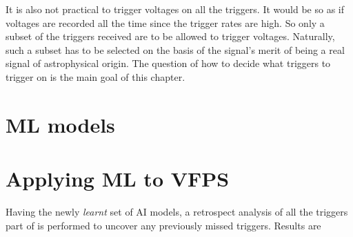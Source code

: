 \par It is also not practical to trigger voltages on all the triggers. It would be so as if voltages are recorded all the time since the trigger rates are high.
So only a subset of the triggers received are to be allowed to trigger voltages. 
Naturally, such a subset has to be selected on the basis of the signal's merit of being a real signal of astrophysical origin.
The question of how to decide what triggers to trigger on is the main goal of this chapter.

\section {ML models}
\label{sec:ml}


\section {Applying ML to VFPS}
\label{sec:ml_vfps}

\par Having the newly \emph{learnt} set of AI models, a retrospect analysis of all the triggers part of \vfpfs is performed to uncover any previously missed triggers.
Results are 

